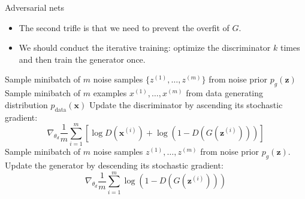 \documentclass[10pt]{beamer}
\begin{document}
	\begin{frame}{Adversarial nets}
		\begin{itemize}
			\item The second trifle is that we need to prevent the overfit of $G$.
			\item We should conduct the iterative training: optimize the discriminator $k$ times and then train the generator once. 
		\end{itemize}
		\begin{algorithm}[H]
			\scriptsize
			\caption{\scriptsize Minibatch stochastic gradient descent training of generative adversarial nets.}
			\label{alg:train-gan}
			\begin{algorithmic}
						\STATE Sample minibatch of $m$ noise samples $\{z^{(1)},\dots,z^{(m)}\}$ from noise prior $p_g(\bm{z})$
						\STATE Sample minibatch of $m$ examples ${x^{(1)},\dots,x^{(m)}}$ from data generating distribution $p_{\text{data}}(\bm{x})$
						\STATE Update the discriminator by ascending its stochastic gradient:
							\vspace{-1em}
							$$
							\nabla_{\theta_{d}}\frac{1}{m}\sum^m_{i=1}\left[\log D\left(\bm{x}^{(i)}\right)+\log\left(1-D\left(G\left(\bm{z}^{(i)}\right)\right)\right)\right]
							$$
							\vspace{-1em}
					\ENDFOR
					\STATE Sample minibatch of $m$ noise samples ${z^{(1)},\dots,z^{(m)}}$ from noise prior $p_g(\bm{z})$.
					\STATE Update the generator by descending its stochastic gradient:
						\vspace{-1em}
						$$
						\nabla_{\theta_{d}}\frac{1}{m}\sum_{i=1}^{m}\log\left(1-D\left(G\left(\bm{z}^{(i)}\right)\right)\right)
						$$
						\vspace{-1em}
				\ENDFOR
			\end{algorithmic}
		\end{algorithm}
	\end{frame}
\end{document}
